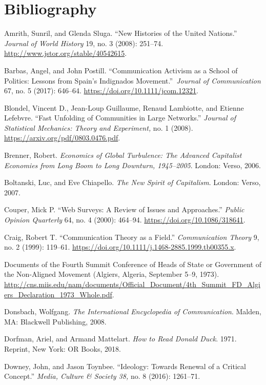 \documentclass{tufte-handout}
\begin{document}
\section{Bibliography}\label{bibliography}

\begin{hangparas}{.25in}{1} 



Amrith, Sunril, and Glenda Sluga. ``New Histories of the United
Nations.'' \emph{Journal of World History} 19, no. 3 (2008): 251--74.
\url{http://www.jstor.org/stable/40542615}.

Barbas, Angel, and John Postill. ``Communication Activism as a School of
Politics: Lessons from Spain's Indignados Movement.''~\emph{Journal of
Communication} 67, no. 5 (2017): 646--64.
\url{https://doi.org/10.1111/jcom.12321}.

Blondel, Vincent D., Jean-Loup Guillaume, Renaud Lambiotte, and Etienne
Lefebvre. ``Fast Unfolding of Communities in Large Networks.''
\emph{Journal of Statistical Mechanics: Theory and Experiment,} no. 1
(2008). \url{https://arxiv.org/pdf/0803.0476.pdf}.

Brenner, Robert. \emph{Economics of Global Turbulence: The Advanced
Capitalist Economies from Long Boom to Long Downturn, 1945--2005}.
London: Verso, 2006.

Boltanski, Luc, and Eve Chiapello. \emph{The New Spirit of Capitalism}.
London: Verso, 2007.

Couper, Mick P. ``Web Surveys: A Review of Issues and Approaches.''
\emph{Public Opinion Quarterly} 64, no. 4 (2000): 464--94.
\url{https://doi.org/10.1086/318641}.

Craig, Robert T. ``Communication Theory as a Field.''
\emph{Communication Theory} 9, no. 2 (1999): 119--61.
\url{https://doi.org/10.1111/j.1468-2885.1999.tb00355.x}.

Documents of the Fourth Summit Conference of Heads of State or
Government of the Non-Aligned Movement (Algiers, Algeria, September
5--9, 1973).
\url{http://cns.miis.edu/nam/documents/Official_Document/4th_Summit_FD_Algiers_Declaration_1973_Whole.pdf}.

Donsbach, Wolfgang. \emph{The International Encyclopedia of
Communication}. Malden, MA: Blackwell Publishing, 2008.

Dorfman, Ariel, and Armand Mattelart. \emph{How to Read Donald Duck}.
1971. Reprint, New York: OR Books, 2018.

Downey, John, and Jason Toynbee. ``Ideology: Towards Renewal of a
Critical Concept.'' \emph{Media, Culture \& Society 38,} no. 8 (2016):
1261--71.


\end{hangparas}
\end{document}
